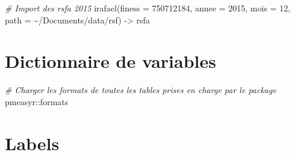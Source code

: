 \documentclass[
]{book}
\newenvironment{Shaded}{\begin{snugshade}}{\end{snugshade}}
\newcommand{\AttributeTok}[1]{\textcolor[rgb]{0.77,0.63,0.00}{#1}}
\newcommand{\CommentTok}[1]{\textcolor[rgb]{0.56,0.35,0.01}{\textit{#1}}}
\newcommand{\DecValTok}[1]{\textcolor[rgb]{0.00,0.00,0.81}{#1}}
\newcommand{\FunctionTok}[1]{\textcolor[rgb]{0.00,0.00,0.00}{#1}}
\newcommand{\NormalTok}[1]{#1}
\newcommand{\OtherTok}[1]{\textcolor[rgb]{0.56,0.35,0.01}{#1}}
\newcommand{\SpecialCharTok}[1]{\textcolor[rgb]{0.00,0.00,0.00}{#1}}
\newcommand{\StringTok}[1]{\textcolor[rgb]{0.31,0.60,0.02}{#1}}
\begin{document}
\begin{Shaded}
\begin{Highlighting}[]
\CommentTok{\# Import des rsfa 2015}
\FunctionTok{irafael}\NormalTok{(}\AttributeTok{finess =} \DecValTok{750712184}\NormalTok{,}
        \AttributeTok{annee =} \DecValTok{2015}\NormalTok{,}
        \AttributeTok{mois =} \DecValTok{12}\NormalTok{,}
        \AttributeTok{path =} \StringTok{\textquotesingle{}\textasciitilde{}/Documents/data/rsf\textquotesingle{}}\NormalTok{) }\OtherTok{{-}\textgreater{}}\NormalTok{ rsfa}
\end{Highlighting}
\end{Shaded}

\hypertarget{dictionnaire-de-variables}{%
\section{Dictionnaire de variables}\label{dictionnaire-de-variables}}

\begin{Shaded}
\end{Shaded}

\begin{Shaded}
\begin{Highlighting}[]
\CommentTok{\# Charger les formats de toutes les tables prises en charge par le package}
\NormalTok{pmeasyr}\SpecialCharTok{::}\NormalTok{formats}
\end{Highlighting}
\end{Shaded}

\hypertarget{labels}{%
\section{Labels}\label{labels}}

\begin{Shaded}
\end{Shaded}
\end{document}
